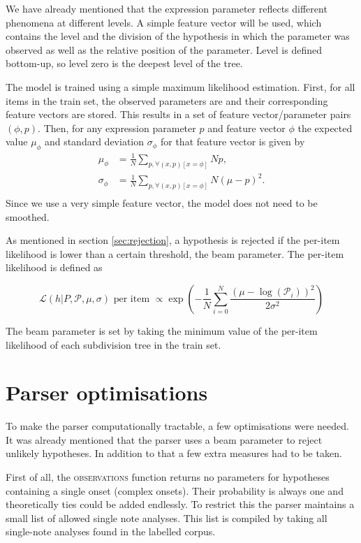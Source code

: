 We have already mentioned that the expression parameter reflects different phenomena at different levels. A simple feature vector will be used, which contains the level and the division of the hypothesis in which the parameter was observed as well as the relative position of the parameter. Level is defined bottom-up, so level zero is the deepest level of the tree.

The model is trained using a simple maximum likelihood estimation. First, for all items in the train set, the observed parameters are and their corresponding feature vectors are stored. This results in a set of feature vector/parameter pairs $(\phi, p)$. Then, for any expression parameter $p$ and feature vector $\phi$ the expected value $\mu_\phi$ and standard deviation $\sigma_\phi$ for that feature vector is given by
\begin{align*}
\label{eq:training}
\mu_\phi &= \frac{1}{N} \sum_{p, \forall (x, p) [x = \phi]}{N} p,\\
\sigma_\phi &= \frac{1}{N} \sum_{p, \forall (x, p) [x = \phi]}{N} (\mu - p)^2.\\
\end{align*}
Since we use a very simple feature vector, the model does not need to be smoothed.

As mentioned in section \ref{sec:rejection}, a hypothesis is rejected if the per-item likelihood is lower than a certain threshold, the beam parameter. The per-item likelihood is defined as

\begin{equation}
\label{eq:per_obs_likelihood}
\mathcal{L}(h|P,\mathcal{P}, \mu, \sigma) \mbox{ per item } \propto \exp\left(-\frac{1}{N}\sum_{i=0}^N \frac{(\mu - \log(\mathcal{P}_i))^2}{2\sigma^2}\right)
\end{equation}

The beam parameter is set by taking the minimum value of the per-item likelihood of each subdivision tree in the train set. 

\section{Parser optimisations}

To make the parser computationally tractable, a few optimisations were needed. It was already mentioned that the parser uses a beam parameter to reject unlikely hypotheses. In addition to that a few extra measures had to be taken.

First of all, the \textsc{observations} function returns no parameters for hypotheses containing a single onset (complex onsets). Their probability is always one and theoretically ties could be added endlessly. To restrict this the parser maintains a small list of allowed single note analyses. This list is compiled by taking all single-note analyses found in the labelled corpus.

